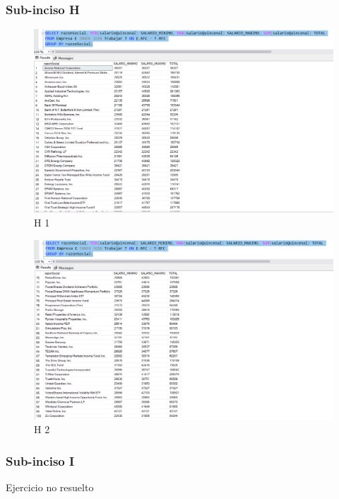 \documentclass[a4paper, 12pt]{report}
\begin{document}
\subsubsection*{Sub-inciso H}
    \begin{figure}
        \includegraphics[width=\textwidth]
            {img/H1.png}\hfill
    \caption{H 1}
    \end{figure}
    \begin{figure}
        \includegraphics[width=\textwidth]
            {img/H2.png}\hfill
    \caption{H 2}
    \end{figure}

\subsubsection*{Sub-inciso I}
Ejercicio no resuelto
\end{document}
